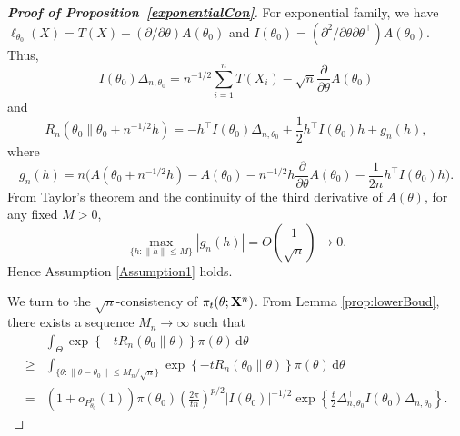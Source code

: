 \documentclass[11pt]{article}
\newcommand{\myT}{\intercal}
\theoremstyle{plain}
\theoremstyle{definition}
\theoremstyle{remark}
\begin{document}
\begin{appendices}
\begin{proof}[\textbf{Proof of Proposition~\ref{exponentialCon}}]
    For exponential family, we have $\dot{\ell}_{\theta_0} (X) = T(X) - ( \partial / \partial \theta ) A(\theta_0)$ and $I(\theta_0) = (\partial^2 /\partial \theta \partial \theta^\myT ) A(\theta_0)$.
    Thus,
    $$
    I(\theta_0)\Delta_{n,\theta_0}=n^{-1/2}\sum_{i=1}^n T(X_i)-\sqrt{n}\frac{\partial}{\partial \theta} A(\theta_0)
    $$
    and
    $$
    R_n ( \theta_0 \| \theta_0 + n^{-1/2}h  )
    =-h^\myT  I(\theta_0) \Delta_{n,\theta_0}+\frac{1}{2} h^\myT  I(\theta_0) h +
    g_n(h),
    $$
    where
    $$
    g_n(h)=n\Big(A(\theta_0+n^{-1/2}h)-A(\theta_0)-n^{-1/2}h \frac{\partial}{\partial \theta}A(\theta_0)-\frac{1}{2n}h^\myT  I(\theta_0) h\Big).
    $$
    From Taylor's theorem and the continuity of the third derivative of $A(\theta)$, 
    for any fixed $M>0$,
    $$
        \max_{\{h:\|h\|\leq M\}}|g_n(h)|=O\left(\frac{1}{\sqrt{n}}\right)\to 0.
    $$
    Hence Assumption \ref{Assumption1} holds.

    We turn to the $\sqrt n$-consistency of $\pi_t(\theta; \mathbf{X}^n)$.
    From Lemma \ref{prop:lowerBoud},
    there exists a sequence $M_n \to \infty$ such that
    \begin{equation}\label{yaotou1}
    \begin{split}
&
    \int_{\Theta} \exp\left\{ -t R_n (\theta_0 \| \theta) \right\} \pi(\theta) \, \mathrm d \theta
    \\
    \geq &
    \int_{\{\theta:\|\theta-\theta_0\|\leq M_n/\sqrt{n}\}}
\exp\left\{ -t R_n (\theta_0 \| \theta) \right\}
     \pi(\theta)\, \mathrm d\theta
    \\
    =&
    (1+o_{P^n_{\theta_0}}(1))
        \pi(\theta_0)
    \left(\frac{2\pi}{t n}\right)^{p/2} |I(\theta_0)|^{-1/2}
    \exp\left\{ \frac{t}{2}\Delta_{n,\theta_0}^\myT  I(\theta_0)\Delta_{n,\theta_0} \right\}
    .
    \end{split}
\end{equation}


\end{proof}
\end{appendices}
\end{document}
